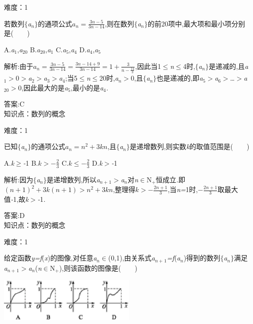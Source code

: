 \documentclass{article} %
\begin{document}
难度：1

 若数列$\mathrm{\{}$\textit{a${}_{n}$}$\mathrm{\}}$的通项公式$a_n=\frac{3n-5}{3n-14}$,则在数列$\mathrm{\{}$\textit{a${}_{n}$}$\mathrm{\}}$的前20项中,最大项和最小项分别是(\textit{　　})

 A.\textit{a}${}_{1}$,\textit{a}${}_{20}$ B.\textit{a}${}_{20}$,\textit{a}${}_{1}$ C.\textit{a}${}_{5}$,\textit{a}${}_{4}$ D.\textit{a}${}_{4}$,\textit{a}${}_{5}$

 解析:由于$a_n=\frac{3n-5}{3n-14}=\frac{3n-14+9}{3n-14}=1+\frac{3}{n-\frac{14}{3}}$,因此当1$\mathrm{\le}$\textit{n}$\mathrm{\le}$4时,$\mathrm{\{}$\textit{a${}_{n}$}$\mathrm{\}}$是递减的,且\textit{a}${}_{1}$\textit{$>$}0\textit{$>$a}${}_{2}$\textit{$>$a}${}_{3}$\textit{$>$a}${}_{4}$;当5$\mathrm{\le}$\textit{n}$\mathrm{\le}$20时,\textit{a${}_{n}$$>$}0,且$\mathrm{\{}$\textit{a${}_{n}$}$\mathrm{\}}$也是递减的,即\textit{a}${}_{5}$\textit{$>$a}${}_{6}$\textit{$>$}{\dots}\textit{$>$a}${}_{20}$\textit{$>$}0,因此最大的是\textit{a}${}_{5}$,最小的是\textit{a}${}_{4}$\textit{.}

 答案:C \\

知识点：数列的概念

难度：1

 已知$\mathrm{\{}$\textit{a${}_{n}$}$\mathrm{\}}$的通项公式$a_n = n^2+3kn$,且$\mathrm{\{}$\textit{a${}_{n}$}$\mathrm{\}}$是递增数列,则实数\textit{k}的取值范围是(\textit{　　})

 A.\textit{k}$\mathrm{\ge}$\textit{-}1 B.$k>-\frac{2}{3}$ C.$k\le -\frac{2}{3}$ D.\textit{k$>$-}1

 解析:因为$\mathrm{\{}$\textit{a${}_{n}$}$\mathrm{\}}$是递增数列,所以\textit{a${}_{n+}$}${}_{1}$\textit{$>$a${}_{n}$}对\textit{n}$\mathrm{\in}$N\textit{${}_{+}$}恒成立\textit{.}即$(n+1)^2+3k(n+1)>n^2+3kn$,整理得$k>-\frac{2n+1}{3}$,当\textit{n=}1时,$-\frac{2n+1}{3}$取最大值\textit{-}1,故\textit{k$>$-}1\textit{.}

 答案:D \\

知识点：数列的概念

难度：1

 给定函数\textit{y=f}(\textit{x})的图像,对任意\textit{a${}_{n}$}$\mathrm{\in}$(0,1),由关系式\textit{a${}_{n+}$}${}_{1}$\textit{=f}(\textit{a${}_{n}$})得到的数列$\mathrm{\{}$\textit{a${}_{n}$}$\mathrm{\}}$满足\textit{a${}_{n+}$}${}_{1}$\textit{$>$a${}_{n}$}(\textit{n}$\mathrm{\in}$N\textit{${}_{+}$}),则该函数的图像是(\textit{　　})

 \includegraphics*[width=2.68in, height=0.85in, keepaspectratio=false]{image87}
\end{document}
